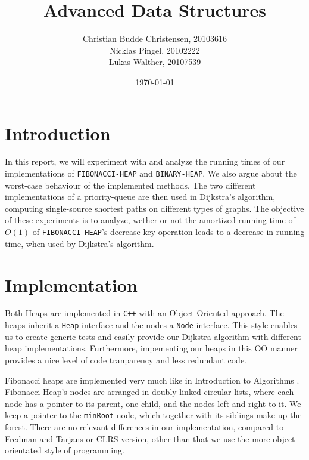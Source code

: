 \documentclass[a4paper,10pt]{article}
\author{Christian Budde Christensen, 20103616\\Nicklas Pingel, 20102222\\Lukas Walther, 20107539}
\title{Advanced Data Structures}
\date{\today}
\begin{document}
\maketitle
\tableofcontents 
\clearpage

\section{Introduction}
In this report, we will experiment with and analyze the running times of our implementations of \texttt{FIBONACCI-HEAP} and \texttt{BINARY-HEAP}. We also argue about the worst-case behaviour of the implemented methods. The two different implementations of a priority-queue are then used in Dijkstra's algorithm, computing single-source shortest paths on different types of graphs. The objective of these experiments is to analyze, wether or not the amortized running time of $O(1)$ of \texttt{FIBONACCI-HEAP}'s decrease-key operation leads to a decrease in running time, when used by Dijkstra's algorithm.

\section{Implementation}
Both Heaps are implemented in \texttt{C++} with an Object Oriented approach. The heaps inherit a \texttt{Heap} interface and the nodes a \texttt{Node} interface. This style enables us to create generic tests and easily provide our Dijkstra algorithm with different heap implementations. Furthermore, impementing our heaps in this OO manner provides a nice level of code tranparency and less redundant code.%

Fibonacci heaps are implemented very much like in Introduction to Algorithms \cite[Chapter 19]{clrs}. Fibonacci Heap's nodes are arranged in doubly linked circular lists, where each node has a pointer to its parent, one child, and the nodes left and right to it. We keep a pointer to the \texttt{minRoot} node, which together with its siblings make up the forest. There are no relevant differences in our implementation, compared to Fredman and Tarjans \cite{fredman} or CLRS \cite{clrs} version, other than that we use the more object-orientated style of programming.
\end{document}
